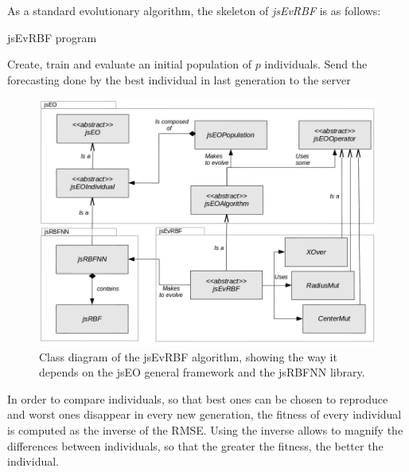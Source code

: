 \documentclass{article}
\begin{document}
As a standard evolutionary algorithm, the skeleton of {\em jsEvRBF} is
as follows:

\begin{algorithm}
\caption{jsEvRBF program}
\begin{algorithmic}
\STATE Create, train and evaluate an initial population of $p$ individuals.
\ENDFOR
\STATE Send the forecasting done by the best individual in last generation to the server
\end{algorithmic}
\end{algorithm}

\begin{figure}[!ht]
\includegraphics[width=120mm]{class-diagram.jpg}
\caption{Class diagram of the jsEvRBF algorithm, showing the way it depends on the jsEO general framework and the jsRBFNN library.}
\label{fig:class_diagram} %
\end{figure}


In order to compare individuals, so that best ones can be chosen to reproduce and worst ones disappear in every new generation, the fitness of every individual is computed as the inverse of the RMSE. Using the inverse allows to magnify the differences between individuals, so that the greater the fitness, the better the individual.
\end{document}
